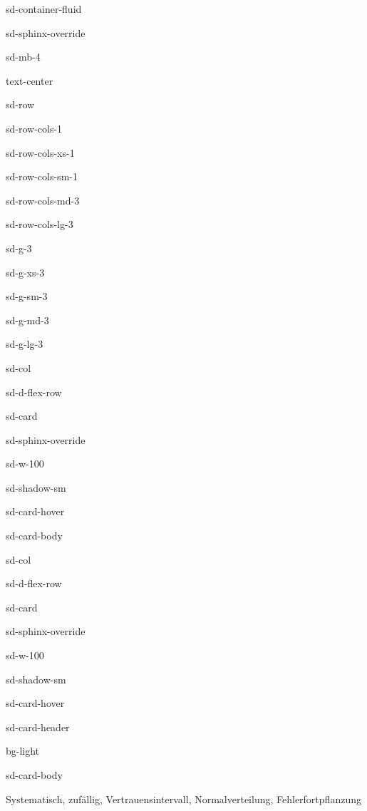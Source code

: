 \documentclass[letterpaper,10pt,english]{jupyterBook}
\let\sphinxpxdimen\pdfpxdimen\else\newdimen\sphinxpxdimen
\begin{document}
\begin{sphinxuseclass}{sd-container-fluid}
\begin{sphinxuseclass}{sd-sphinx-override}
\begin{sphinxuseclass}{sd-mb-4}
\begin{sphinxuseclass}{text-center}
\begin{sphinxuseclass}{sd-row}
\begin{sphinxuseclass}{sd-row-cols-1}
\begin{sphinxuseclass}{sd-row-cols-xs-1}
\begin{sphinxuseclass}{sd-row-cols-sm-1}
\begin{sphinxuseclass}{sd-row-cols-md-3}
\begin{sphinxuseclass}{sd-row-cols-lg-3}
\begin{sphinxuseclass}{sd-g-3}
\begin{sphinxuseclass}{sd-g-xs-3}
\begin{sphinxuseclass}{sd-g-sm-3}
\begin{sphinxuseclass}{sd-g-md-3}
\begin{sphinxuseclass}{sd-g-lg-3}
\begin{sphinxuseclass}{sd-col}
\begin{sphinxuseclass}{sd-d-flex-row}
\begin{sphinxuseclass}{sd-card}
\begin{sphinxuseclass}{sd-sphinx-override}
\begin{sphinxuseclass}{sd-w-100}
\begin{sphinxuseclass}{sd-shadow-sm}
\begin{sphinxuseclass}{sd-card-hover}
\begin{sphinxuseclass}{sd-card-body}
\end{sphinxuseclass}{\hyperref[\detokenize{content/0_Basics::doc}]{}}
\end{sphinxuseclass}
\end{sphinxuseclass}
\end{sphinxuseclass}
\end{sphinxuseclass}
\end{sphinxuseclass}
\end{sphinxuseclass}
\end{sphinxuseclass}
\begin{sphinxuseclass}{sd-col}
\begin{sphinxuseclass}{sd-d-flex-row}
\begin{sphinxuseclass}{sd-card}
\begin{sphinxuseclass}{sd-sphinx-override}
\begin{sphinxuseclass}{sd-w-100}
\begin{sphinxuseclass}{sd-shadow-sm}
\begin{sphinxuseclass}{sd-card-hover}
\begin{sphinxuseclass}{sd-card-header}
\begin{sphinxuseclass}{bg-light}
\sphinxAtStartPar
{}

\end{sphinxuseclass}
\end{sphinxuseclass}
\begin{sphinxuseclass}{sd-card-body}
\noindent\sphinxincludegraphics[height=120\sphinxpxdimen]{{tab_norm_grenzen}.png}

\sphinxAtStartPar
Systematisch, zufällig, Vertrauensintervall, Normalverteilung, Fehlerfortpflanzung


\end{sphinxuseclass}
\end{sphinxuseclass}
\end{sphinxuseclass}
\end{sphinxuseclass}
\end{sphinxuseclass}
\end{sphinxuseclass}
\end{sphinxuseclass}
\end{sphinxuseclass}
\end{sphinxuseclass}
\end{sphinxuseclass}
\end{sphinxuseclass}
\end{sphinxuseclass}
\end{sphinxuseclass}
\end{sphinxuseclass}
\end{sphinxuseclass}
\end{sphinxuseclass}
\end{sphinxuseclass}
\end{sphinxuseclass}
\end{sphinxuseclass}
\end{sphinxuseclass}
\end{sphinxuseclass}
\end{sphinxuseclass}
\end{sphinxuseclass}
\end{document}
